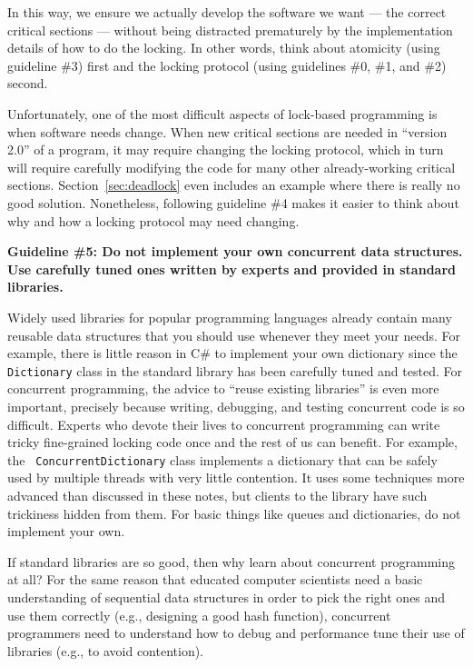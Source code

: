 \documentclass[10pt]{article}
\begin{document}
In this way, we ensure we actually develop the software we want ---
the correct critical sections --- without being distracted prematurely
by the implementation details of how to do the locking.  In other
words, think about atomicity (using guideline \#3) first and the
locking protocol (using guidelines \#0, \#1, and \#2) second.

Unfortunately, one of the most difficult aspects of lock-based
programming is when software needs change.  When new critical sections
are needed in ``version 2.0'' of a program, it may require changing
the locking protocol, which in turn will require carefully modifying
the code for many other already-working critical sections.
Section~\ref{sec:deadlock} even includes an example where there is
really no good solution.  Nonetheless, following guideline \#4 makes
it easier to think about why and how a locking protocol may need
changing.

\goodbreak
\medskip
\noindent\textbf{Guideline \#5: Do not implement your own concurrent
  data structures.  Use carefully tuned ones written by experts and
  provided in standard libraries.}
\medskip

Widely used libraries for popular programming languages already
contain many reusable data structures that you should use whenever
they meet your needs.  For example, there is little reason in C\# to
implement your own dictionary since the {\tt Dictionary} class in the
standard library has been carefully tuned and tested.  For concurrent
programming, the advice to ``reuse existing libraries'' is even more
important, precisely because writing, debugging, and testing
concurrent code is so difficult.  Experts who devote their lives to
concurrent programming can write tricky fine-grained locking code once
and the rest of us can benefit.  For example, the {\tt
  ConcurrentDictionary} class implements a dictionary that can be safely
used by multiple threads with very little contention.  It
uses some techniques more advanced than discussed in these notes, but
clients to the library have such trickiness hidden from them.  For
basic things like queues and dictionaries, do not implement your own.

If standard libraries are so good, then why learn about concurrent
programming at all?  For the same reason that educated computer
scientists need a basic understanding of sequential data structures in
order to pick the right ones and use them correctly (e.g., designing a
good hash function), concurrent programmers need to understand how to
debug and performance tune their use of libraries (e.g., to avoid
contention).
\end{document}
